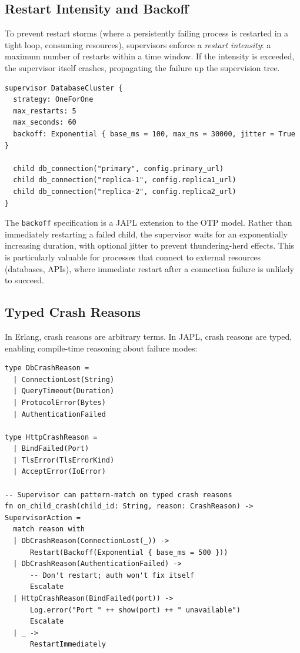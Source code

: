 \documentclass[11pt,a4paper]{article}
\begin{document}
\subsection{Restart Intensity and Backoff}

To prevent restart storms (where a persistently failing process is restarted in a tight loop, consuming resources), supervisors enforce a \emph{restart intensity}: a maximum number of restarts within a time window. If the intensity is exceeded, the supervisor itself crashes, propagating the failure up the supervision tree.

\begin{lstlisting}[language=japl,caption={Declarative backoff for restart intensity}]
supervisor DatabaseCluster {
  strategy: OneForOne
  max_restarts: 5
  max_seconds: 60
  backoff: Exponential { base_ms = 100, max_ms = 30000, jitter = True }

  child db_connection("primary", config.primary_url)
  child db_connection("replica-1", config.replica1_url)
  child db_connection("replica-2", config.replica2_url)
}
\end{lstlisting}

The \texttt{backoff} specification is a JAPL extension to the OTP model. Rather than immediately restarting a failed child, the supervisor waits for an exponentially increasing duration, with optional jitter to prevent thundering-herd effects. This is particularly valuable for processes that connect to external resources (databases, APIs), where immediate restart after a connection failure is unlikely to succeed.

\subsection{Typed Crash Reasons}

In Erlang, crash reasons are arbitrary terms. In JAPL, crash reasons are typed, enabling compile-time reasoning about failure modes:

\begin{lstlisting}[language=japl,caption={Typed crash reasons}]
type DbCrashReason =
  | ConnectionLost(String)
  | QueryTimeout(Duration)
  | ProtocolError(Bytes)
  | AuthenticationFailed

type HttpCrashReason =
  | BindFailed(Port)
  | TlsError(TlsErrorKind)
  | AcceptError(IoError)

-- Supervisor can pattern-match on typed crash reasons
fn on_child_crash(child_id: String, reason: CrashReason) -> SupervisorAction =
  match reason with
  | DbCrashReason(ConnectionLost(_)) ->
      Restart(Backoff(Exponential { base_ms = 500 }))
  | DbCrashReason(AuthenticationFailed) ->
      -- Don't restart; auth won't fix itself
      Escalate
  | HttpCrashReason(BindFailed(port)) ->
      Log.error("Port " ++ show(port) ++ " unavailable")
      Escalate
  | _ ->
      RestartImmediately
\end{lstlisting}
\end{document}
